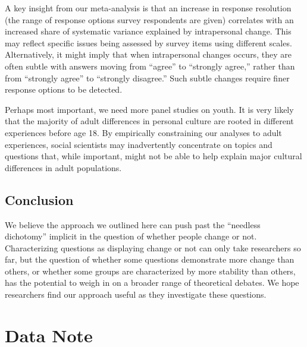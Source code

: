 \documentclass[
  11pt,
]{article}
\begin{document}
A key insight from our meta-analysis is that an increase in response
resolution (the range of response options survey respondents are given)
correlates with an increased share of systematic variance explained by
intrapersonal change. This may reflect specific issues being assessed by
survey items using different scales. Alternatively, it might imply that
when intrapersonal changes occurs, they are often subtle with answers
moving from ``agree'' to ``strongly agree,'' rather than from ``strongly
agree'' to ``strongly disagree.'' Such subtle changes require finer
response options to be detected.

Perhaps most important, we need more panel studies on youth. It is very
likely that the majority of adult differences in personal culture are
rooted in different experiences before age 18. By empirically
constraining our analyses to adult experiences, social scientists may
inadvertently concentrate on topics and questions that, while important,
might not be able to help explain major cultural differences in adult
populations.

\subsection{Conclusion}\label{conclusion}

We believe the approach we outlined here can push past the ``needless
dichotomy'' implicit in the question of whether people change or not.
Characterizing questions as displaying change or not can only take
researchers so far, but the question of whether some questions
demonstrate more change than others, or whether some groups are
characterized by more stability than others, has the potential to weigh
in on a broader range of theoretical debates. We hope researchers find
our approach useful as they investigate these questions.

\section{Data Note}\label{data-note}
\end{document}
